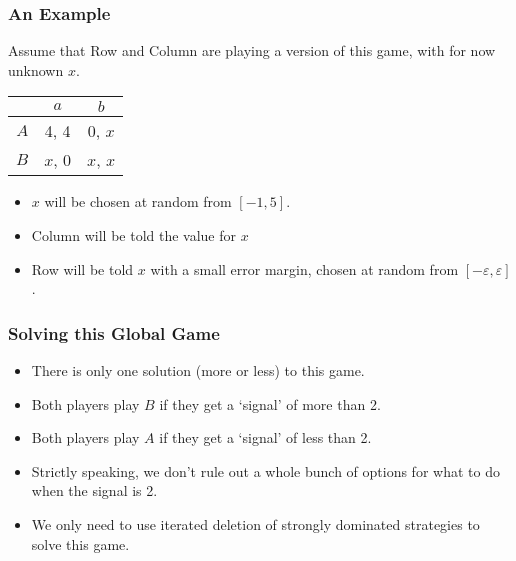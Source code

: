 \begin{frame}

\frametitle{An Example}
\label{anexample}

Assume that Row and Column are playing a version of this game, with for now unknown $x$.


\begin{center}
\begin{tabular}{r | c c}
& $a$ & $b$ \\ \hline
$A$ & 4, 4 & 0, $x$ \\
$B$ & $x$, 0 & $x$, $x$
\end{tabular}
\end{center}


\begin{itemize}
\item $x$ will be chosen at random from $[-1, 5]$.

\item Column will be told the value for $x$

\item Row will be told $x$ with a small error margin, chosen at random from $[-\varepsilon, \varepsilon]$.

\end{itemize}
\end{frame}

\begin{frame}

\frametitle{Solving this Global Game}
\label{solvingthisglobalgame}

\begin{itemize}
\item There is only one solution (more or less) to this game.

\item Both players play $B$ if they get a `signal' of more than 2.

\item Both players play $A$ if they get a `signal' of less than 2.

\item Strictly speaking, we don't rule out a whole bunch of options for what to do when the signal is 2.

\item We only need to use iterated deletion of strongly dominated strategies to solve this game.

\end{itemize}
\end{frame}

